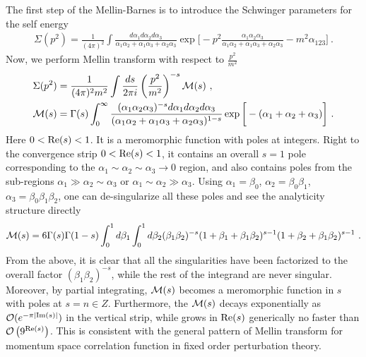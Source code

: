 \documentclass[a4paper,11pt]{article}
\begin{document}
The first step of the Mellin-Barnes is to introduce the Schwinger parameters for the self energy
\begin{align}
\Sigma(p^2)=\frac{1}{(4\pi)^2}\int \frac{d\alpha_1d\alpha_2d\alpha_3}{\alpha_{1}\alpha_2+\alpha_{1}\alpha_3+\alpha_{2}\alpha_3}\exp \bigg[-p^2\frac{\alpha_{1}\alpha_2\alpha_3}{\alpha_{1}\alpha_2+\alpha_{1}\alpha_3+\alpha_{2}\alpha_3}-m^2\alpha_{123}\bigg] \ .
\end{align}
Now, we perform Mellin transform with respect to $\frac{p^2}{m^2}$
\begin{align}
&\Sigma(p^2)=\frac{1}{(4\pi)^2 m^2}\int \frac{ds}{2\pi i} \left(\frac{p^2}{m^2}\right)^{-s}{\cal M}(s) \ , \\
&{\cal M}(s)=\Gamma(s)\int_{0}^{\infty} \frac{(\alpha_1\alpha_2\alpha_3)^{-s}d\alpha_1d\alpha_2d\alpha_3}{(\alpha_{1}\alpha_{2}+\alpha_1\alpha_3+\alpha_{2}\alpha_3)^{1-s}}\exp \bigg[-(\alpha_1+\alpha_{2}+\alpha_3)\bigg] \ .
\end{align}
Here $0<{\rm Re}(s)<1$. It is a meromorphic function with poles at integers. Right to the convergence strip $0<{\rm Re}(s)<1$, it contains an overall $s=1$ pole corresponding to the $\alpha_1\sim\alpha_2\sim\alpha_3 \rightarrow 0$ region, and also contains poles from the sub-regions $\alpha_1 \gg \alpha_2\sim\alpha_3$ or $\alpha_1\sim \alpha_2 \gg \alpha_3$. Using $\alpha_1=\beta_0$, $\alpha_2=\beta_0\beta_1$, $\alpha_3=\beta_0\beta_1\beta_2$, one can de-singularize all these poles and see the analyticity structure directly
\begin{align}
{\cal M}(s)=6\Gamma(s)\Gamma(1-s)\int_0^1 d\beta_1\int_0^1 d\beta_2(\beta_1\beta_2)^{-s}(1+\beta_1+\beta_1\beta_2)^{s-1}(1+\beta_2+\beta_1\beta_2)^{s-1} \ .
\end{align}
From the above, it is clear that all the singularities have been factorized to the overall factor $(\beta_1\beta_2)^{-s}$, while the rest of the integrand are never singular. Moreover, by partial integrating, ${\cal M}(s)$ becomes a meromorphic function in $s$ with poles at $s=n \in Z$. Furthermore, the ${\cal M}(s)$ decays exponentially as ${\cal O}(e^{-\pi|{\rm Im}(s)|})$ in the vertical strip, while grows in ${\rm Re}(s)$ generically no faster than ${\cal O}\left(9^{{\rm Re}(s)}\right)$. This is consistent with the general pattern of Mellin transform for momentum space correlation function in fixed order perturbation theory. 
\end{document}
